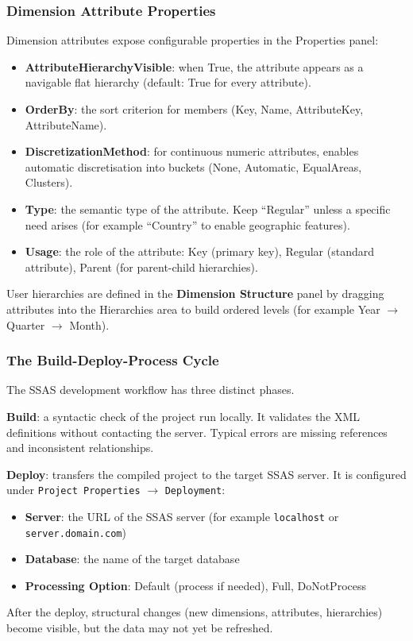\subsubsection{Dimension Attribute Properties}
\label{subsec:attribute-properties}

Dimension attributes expose configurable properties in the Properties panel:

\begin{itemize}
    \item \textbf{AttributeHierarchyVisible}: when True, the attribute appears as a navigable flat hierarchy (default: True for every attribute).
    \item \textbf{OrderBy}: the sort criterion for members (Key, Name, AttributeKey, AttributeName).
    \item \textbf{DiscretizationMethod}: for continuous numeric attributes, enables automatic discretisation into buckets (None, Automatic, EqualAreas, Clusters).
    \item \textbf{Type}: the semantic type of the attribute. Keep ``Regular'' unless a specific need arises (for example ``Country'' to enable geographic features).
    \item \textbf{Usage}: the role of the attribute: Key (primary key), Regular (standard attribute), Parent (for parent-child hierarchies).
\end{itemize}

User hierarchies are defined in the \textbf{Dimension Structure} panel by dragging attributes into the Hierarchies area to build ordered levels (for example Year $\rightarrow$ Quarter $\rightarrow$ Month).

\subsubsection{The Build-Deploy-Process Cycle}
\label{subsec:build-deploy-process}

The SSAS development workflow has three distinct phases.

\textbf{Build}: a syntactic check of the project run locally. It validates the XML definitions without contacting the server. Typical errors are missing references and inconsistent relationships.

\textbf{Deploy}: transfers the compiled project to the target SSAS server. It is configured under \texttt{Project Properties} $\rightarrow$ \texttt{Deployment}:
\begin{itemize}
    \item \textbf{Server}: the URL of the SSAS server (for example \texttt{localhost} or \texttt{server.domain.com})
    \item \textbf{Database}: the name of the target database
    \item \textbf{Processing Option}: Default (process if needed), Full, DoNotProcess
\end{itemize}
After the deploy, structural changes (new dimensions, attributes, hierarchies) become visible, but the data may not yet be refreshed.

